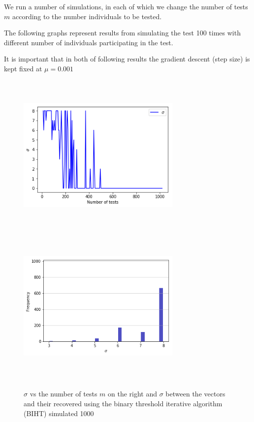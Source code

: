 We run a number of simulations, in each of which we change the number of tests $ m $ according to the number individuals to be tested. 

The following graphs represent results from simulating the test 100 times with different number of individuals participating in the test.  

It is important that in both of following results the gradient descent (step size)  is kept fixed at $ \mu = 0.001 $

 \begin{figure}[H]
	\includegraphics[height=8cm, width=8cm]{images/sigmavsm}
	\includegraphics[height=8cm, width=8cm]{images/sigma_512}
	\caption{$ \sigma $ vs the number of tests $ m $ on the right and $ \sigma $ between the vectors and their recovered using the binary threshold iterative algorithm (BIHT) simulated 1000}
	\label{sigma}
\end{figure}
